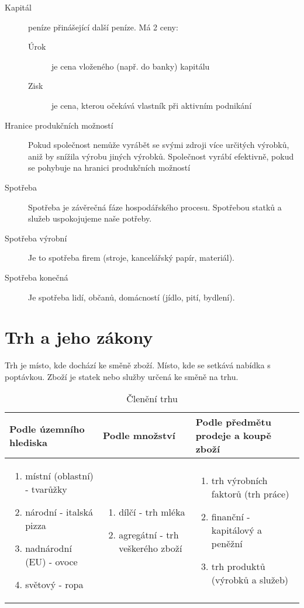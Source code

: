 \documentclass[11pt,a4paper,twoside]{book}
\begin{document}
\begin{description}
	\item[Kapitál] peníze přinášející další peníze. Má 2 ceny:
		\begin{description}
			\item[Úrok] je cena vloženého (např. do banky) kapitálu
			\item[Zisk] je cena, kterou očekává vlastník při aktivním podnikání
		\end{description}
	\item[Hranice produkčních možností] Pokud společnost nemůže vyrábět se svými zdroji více určitých výrobků, aniž by snížila výrobu jiných výrobků. Společnost vyrábí efektivně, pokud se pohybuje na hranici produkčních možností
	\item[Spotřeba] Spotřeba je závěrečná fáze hospodářského procesu. Spotřebou statků a služeb uspokojujeme naše potřeby.
	\item[Spotřeba výrobní] Je to spotřeba firem (stroje, kancelářský papír, materiál).
	\item[Spotřeba konečná] Je spotřeba lidí, občanů, domácností (jídlo, pití, bydlení).
\end{description}

\chapter{Trh a jeho zákony}

Trh je místo, kde dochází ke směně zboží. Místo, kde se setkává nabídka s poptávkou.
Zboží je statek nebo služby určená ke směně na trhu.

\begin{table}[h]
    \centering
	\caption{Členění trhu}
\begin{tabular}{| p{5cm} | p{5cm} | p{5cm} |}
	\hline
		Podle územního hlediska &
		Podle množství &
		Podle předmětu prodeje a koupě zboží \\
	\hline
		\begin{enumerate}[label=(\alph*)]
			\item místní (oblastní) - tvarůžky
			\item národní - italská pizza 
			\item nadnárodní (EU) - ovoce 
			\item světový - ropa
		\end{enumerate} &
		\begin{enumerate}[label=(\alph*)]
			\item dílčí - trh mléka
			\item agregátní - trh veškerého zboží
		\end{enumerate} &
		\begin{enumerate}[label=(\alph*)]
			\item trh výrobních faktorů (trh práce)
			\item finanční - kapitálový a peněžní
			\item trh produktů (výrobků a služeb)
		\end{enumerate} \\
	\hline
\end{tabular}
\end{table}
\end{document}
